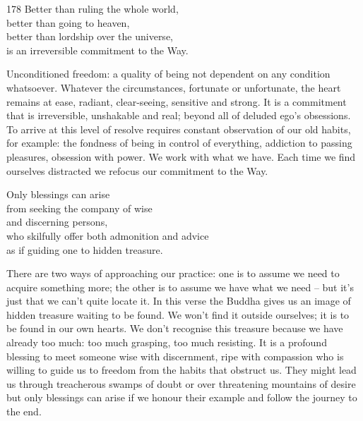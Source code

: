 
\begin{dhpVerse}{178}
\label{dhp-178}
Better than ruling the whole world,\\
better than going to heaven,\\
better than lordship over the universe,\\
is an irreversible commitment to the Way.
\end{dhpVerse}

\begin{dhpRefl}

Unconditioned freedom: a quality of being not dependent on any
condition whatsoever. Whatever the circumstances, fortunate or
unfortunate, the heart remains at ease, radiant, clear-seeing,
sensitive and strong. It is a commitment that is irreversible,
unshakable and real; beyond all of deluded ego's obsessions. To
arrive at this level of resolve requires constant observation of our
old habits, for example: the fondness of being in control of
everything, addiction to passing pleasures, obsession with power. We
work with what we have. Each time we find ourselves distracted we
refocus our commitment to the Way.

\end{dhpRefl}


\begin{dhpVerse}{76}
\label{dhp-76}
Only blessings can arise\\
from seeking the company of wise\\
and discerning persons,\\
who skilfully offer both admonition and advice\\
as if guiding one to hidden treasure.
\end{dhpVerse}

\begin{dhpRefl}

There are two ways of approaching our practice: one is to assume we need to
acquire something more; the other is to assume we have what we need -- but it's
just that we can't quite locate it. In this verse the Buddha gives us an image
of hidden treasure waiting to be found. We won't find it outside ourselves; it
is to be found in our own hearts. We don't recognise this treasure because we
have already too much: too much grasping, too much resisting. It is a profound
blessing to meet someone wise with discernment, ripe with compassion who is
willing to guide us to freedom from the habits that obstruct us. They might
lead us through treacherous swamps of doubt or over threatening mountains of
desire but only blessings can arise if we honour their example and follow the
journey to the end.

\end{dhpRefl}

